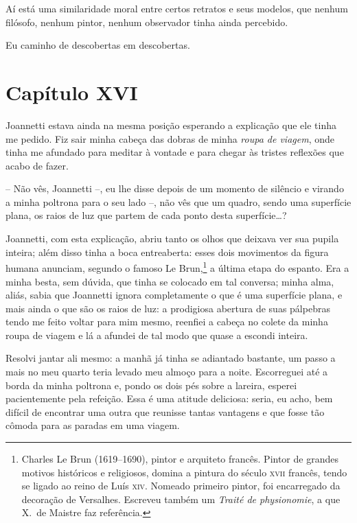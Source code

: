 Aí está uma similaridade moral entre certos retratos e seus modelos, que
nenhum filósofo, nenhum pintor, nenhum observador tinha ainda
percebido.

Eu caminho de descobertas em descobertas.

\section*{Capítulo XVI}

 Joannetti estava ainda na mesma posição esperando a explicação que ele
tinha me pedido. Fiz sair minha cabeça das dobras de minha
\textit{roupa de viagem}, onde tinha me afundado para meditar à vontade
e para chegar às tristes reflexões que acabo de fazer.  

-- Não vês, Joannetti --, eu lhe disse depois de um momento de silêncio e
virando a minha poltrona para o seu lado --, não vês que um quadro, sendo
uma superfície plana, os raios de luz que partem de cada ponto desta
superfície\ldots?

Joannetti, com esta explicação, abriu tanto os olhos que deixava ver sua
pupila inteira; além disso tinha a boca entreaberta: esses dois
movimentos da figura humana anunciam, segundo o famoso Le
Brun,\footnote{ Charles Le Brun (1619--1690), pintor e arquiteto francês.
Pintor de grandes motivos históricos e religiosos, domina a pintura do
século \textsc{xvii} francês, tendo se ligado ao reino de Luís \textsc{xiv}. Nomeado
primeiro pintor, foi encarregado da decoração de Versalhes. Escreveu
também um \textit{Traité de physionomie}, a que X.~de Maistre faz
referência.} a última etapa do espanto. Era a minha besta, sem
dúvida, que tinha se colocado em tal conversa; minha alma, aliás, sabia
que Joannetti ignora completamente o que é uma superfície plana, e mais
ainda o que são os raios de luz: a prodigiosa abertura de suas
pálpebras tendo me feito voltar para mim mesmo, reenfiei a cabeça no
colete da minha roupa de viagem e lá a afundei de tal modo que quase a
escondi inteira.

 Resolvi jantar ali mesmo: a manhã já tinha se adiantado bastante, um
passo a mais no meu quarto teria levado meu almoço para a noite.
Escorreguei até a borda da minha poltrona e, pondo os dois pés sobre a
lareira, esperei pacientemente pela refeição. Essa é uma atitude
deliciosa: seria, eu acho, bem difícil de encontrar uma outra que
reunisse tantas vantagens e que fosse tão cômoda para as paradas em uma
viagem. 

